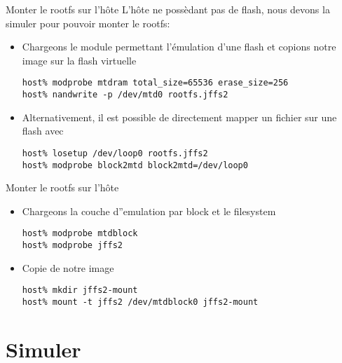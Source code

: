 \begin{frame}[fragile=singleslide]{Monter le rootfs sur l'hôte}
  L'hôte  ne possèdant  pas  de  flash, nous  devons  la simuler  pour
  pouvoir monter le rootfs:
  \begin{itemize} 
  \item  Chargeons le  module  permettant l'émulation  d'une flash  et
    copions notre image sur la flash virtuelle
    \begin{lstlisting}
host% modprobe mtdram total_size=65536 erase_size=256
host% nandwrite -p /dev/mtd0 rootfs.jffs2
    \end{lstlisting}
  \item  Alternativement, il  est  possible de  directement mapper  un
    fichier sur une flash avec 
    \begin{lstlisting}
host% losetup /dev/loop0 rootfs.jffs2
host% modprobe block2mtd block2mtd=/dev/loop0
    \end{lstlisting} 
  \end{itemize}
\end{frame}

\begin{frame}[fragile=singleslide]{Monter le rootfs sur l'hôte}
  \begin{itemize} 
  \item Chargeons la couche d''emulation par block et le filesystem
    \begin{lstlisting}
host% modprobe mtdblock
host% modprobe jffs2
    \end{lstlisting}
  \item Copie de notre image
    \begin{lstlisting} 
host% mkdir jffs2-mount
host% mount -t jffs2 /dev/mtdblock0 jffs2-mount
    \end{lstlisting} 
  \end{itemize}
\end{frame}


\section{Simuler}

